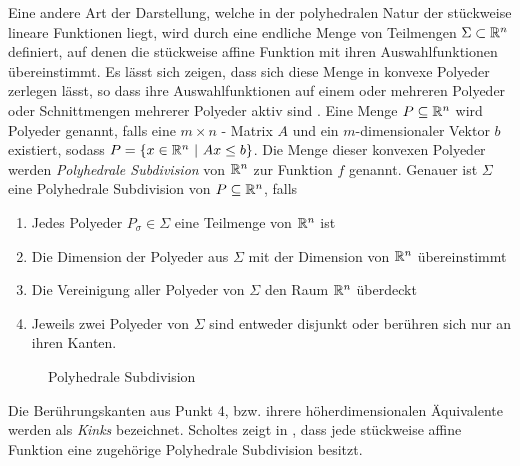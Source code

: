 Eine andere Art der Darstellung, welche in der polyhedralen Natur der stückweise lineare Funktionen liegt, wird durch eine endliche Menge von Teilmengen $\Sigma\subset \mathbb{R}^n$ definiert, auf denen die stückweise affine Funktion mit ihren Auswahlfunktionen übereinstimmt. Es lässt sich zeigen, dass sich diese Menge in konvexe Polyeder zerlegen lässt, so dass ihre Auswahlfunktionen auf einem oder mehreren Polyeder oder Schnittmengen mehrerer Polyeder aktiv sind \cite[S.23 ff.]{scholtes2012introduction}.
 Eine Menge $P\subseteq \mathbb{R}^n$ wird Polyeder genannt, falls eine $m\times n$ - Matrix $A$ und ein $m$-dimensionaler Vektor $b$ existiert, sodass $P = \lbrace x\in \mathbb{R}^n ~|~ Ax\leq b \rbrace$. 
Die Menge dieser konvexen Polyeder werden \textit{Polyhedrale Subdivision} von $\mathbb{R}^n$ zur Funktion $f$ genannt. Genauer ist $\Sigma$ eine Polyhedrale Subdivision von $P \subseteq \mathbb{R}^n$, falls
\begin{enumerate}
 \item Jedes Polyeder $P_\sigma \in \Sigma$ eine Teilmenge von $\mathbb{R}^n$ ist
 \item Die Dimension der Polyeder aus $\Sigma$ mit der Dimension von $\mathbb{R}^n$ übereinstimmt
 \item Die Vereinigung aller Polyeder von $\Sigma$ den Raum $\mathbb{R}^n$ überdeckt
 \item Jeweils zwei Polyeder von $\Sigma$ sind entweder disjunkt oder berühren sich nur an ihren Kanten.
\end{enumerate}
\begin{figure}[H]
\centering

\caption{Polyhedrale Subdivision}
\label{fig:polyhedralSubdivision}
\end{figure}
Die Berührungskanten aus Punkt 4, bzw. ihrere höherdimensionalen Äquivalente werden als \textit{Kinks} bezeichnet. 
Scholtes zeigt in \cite[Prop. 2.2.3.]{scholtes2012introduction}, dass jede stückweise affine Funktion eine zugehörige Polyhedrale Subdivision besitzt.

